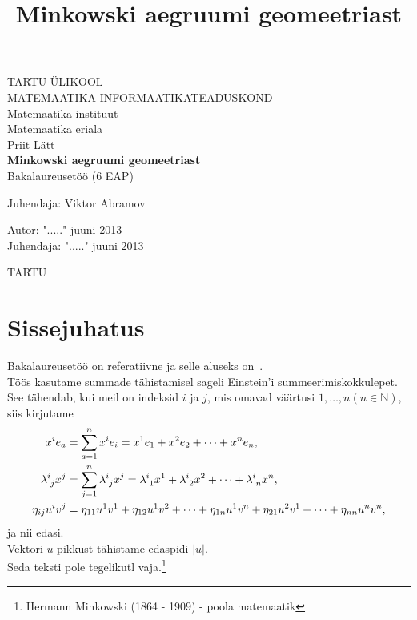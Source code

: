 \documentclass[a4paper,12pt]{article}
\title{Minkowski aegruumi geomeetriast}
\theoremstyle{plain}
\theoremstyle{definition}
\numberwithin{equation}{section}
\def\N{{\mathbb N}}
\begin{document}
\begin{titlepage}
\begin{center}

{\large TARTU ÜLIKOOL}\\[0.3cm]
{\large MATEMAATIKA-INFORMAATIKATEADUSKOND}\\[0.3cm]
{\large Matemaatika instituut}\\[0.3cm]
{\large Matemaatika eriala}\\[3cm]

{\large Priit Lätt}\\[0.3cm]
{\huge \textbf{Minkowski aegruumi geomeetriast}}\\[0.3cm]
{\large Bakalaureusetöö (6 EAP)}\\[3cm]

\begin{flushright}
{\large Juhendaja: Viktor Abramov}
\end{flushright}

\vfill

\begin{flushleft}
{\large
Autor: \dotfill "....." juuni 2013\\
Juhendaja: \dotfill "....." juuni 2013\\[2cm]
}
\end{flushleft}
{\large TARTU \the\year}

\end{center}
\end{titlepage}

\tableofcontents
\newpage

\section{Sissejuhatus}

Bakalaureusetöö on referatiivne ja selle aluseks on~\cite{Naber}. \\
Töös kasutame summade tähistamisel sageli Einstein'i summeerimiskokkulepet. See tähendab, kui meil on indeksid $i$ ja $j$, mis omavad väärtusi $1, \dots, n \left( n \in \N \right)$, siis kirjutame 
\begin{align*}
x^{i} e_{a} &= \sum_{a=1}^{n} x^{i} e_{i} = x^{1} e_{1} + x^{2} e_{2} + \dots + x^{n} e_{n}, \\
\lambda\indices{^i_j} x^{j} &= \sum_{j=1}^{n} \lambda\indices{^i_j} x^{j} = \lambda\indices{^i_1} x^{1} + \lambda\indices{^i_2} x^{2} + \dots +\lambda\indices{^i_n} x^{n},\\
\eta_{ij} u^{i} v^{j} &= \eta_{11} u^{1} v^{1} + \eta_{12} u^{1} v^{2} + \dots + \eta_{1n} u^{1} v^{n} + \eta_{21} u^{2} v^{1} + \dots + \eta_{nn} u^{n} v^{n},
\end{align*}
ja nii edasi.\\
Vektori $u$ pikkust tähistame edaspidi $|u|$. \\
Seda teksti pole tegelikutl vaja.\footnote{Hermann Minkowski (1864 - 1909) - poola matemaatik}
\end{document}

